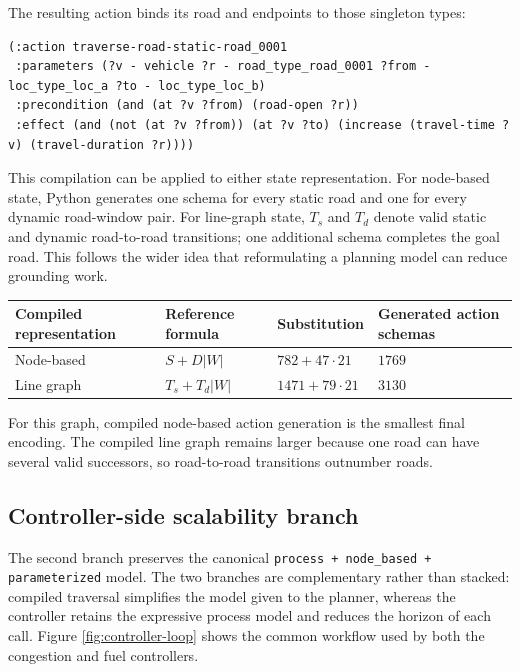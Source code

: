 \documentclass[10pt]{article}
\begin{document}
The resulting action binds its road and endpoints to those singleton types:

\vspace{0.5em}

\begin{lstlisting}
(:action traverse-road-static-road_0001
 :parameters (?v - vehicle ?r - road_type_road_0001 ?from - loc_type_loc_a ?to - loc_type_loc_b)
 :precondition (and (at ?v ?from) (road-open ?r))
 :effect (and (not (at ?v ?from)) (at ?v ?to) (increase (travel-time ?v) (travel-duration ?r))))
\end{lstlisting}

This compilation can be applied to either state representation. For node-based
state, Python generates one schema for every static road and one for every
dynamic road-window pair. For line-graph state, $T_s$ and $T_d$ denote valid
static and dynamic road-to-road transitions; one additional schema completes
the goal road. This follows the wider idea that reformulating a planning model
can reduce grounding work.

\begin{center}
\scriptsize
\begin{tabular}{@{}llll@{}}
\toprule
Compiled representation & Reference formula & Substitution
& Generated action schemas \\
\midrule
Node-based
& $S+D|W|$
& $782+47\cdot21$
& $1769$ \\

Line graph
& $T_s+T_d|W|$
& $1471+79\cdot21$
& $3130$ \\
\bottomrule
\end{tabular}
\end{center}

For this graph, compiled node-based action generation is the smallest final
encoding. The compiled line graph remains larger because one road can have
several valid successors, so road-to-road transitions outnumber roads.

\subsection{Controller-side scalability branch}
The second branch preserves the canonical
\texttt{process + node\_based + parameterized} model. The two branches are complementary rather than
stacked: compiled traversal simplifies the model given to the planner, whereas
the controller retains the expressive process model and reduces the horizon of
each call. Figure \ref{fig:controller-loop} shows the common workflow used by both the
congestion and fuel controllers.
\end{document}
